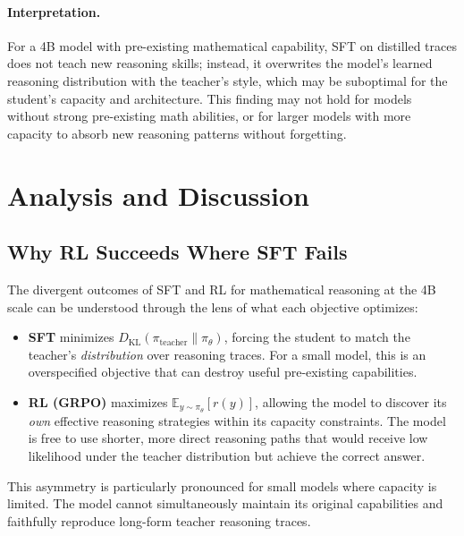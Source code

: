 \documentclass[11pt,a4paper]{article}
\begin{document}
\paragraph{Interpretation.} For a 4B model with pre-existing mathematical capability, SFT on distilled traces does not teach new reasoning skills; instead, it overwrites the model's learned reasoning distribution with the teacher's style, which may be suboptimal for the student's capacity and architecture. This finding may not hold for models without strong pre-existing math abilities, or for larger models with more capacity to absorb new reasoning patterns without forgetting.

\section{Analysis and Discussion}
\label{sec:discussion}

\subsection{Why RL Succeeds Where SFT Fails}

The divergent outcomes of SFT and RL for mathematical reasoning at the 4B scale can be understood through the lens of what each objective optimizes:

\begin{itemize}[leftmargin=*]
    \item \textbf{SFT} minimizes $D_\text{KL}(\pi_{\text{teacher}} \| \pi_\theta)$, forcing the student to match the teacher's \emph{distribution} over reasoning traces. For a small model, this is an overspecified objective that can destroy useful pre-existing capabilities.

    \item \textbf{RL (GRPO)} maximizes $\mathbb{E}_{y \sim \pi_\theta}[r(y)]$, allowing the model to discover its \emph{own} effective reasoning strategies within its capacity constraints. The model is free to use shorter, more direct reasoning paths that would receive low likelihood under the teacher distribution but achieve the correct answer.
\end{itemize}

This asymmetry is particularly pronounced for small models where capacity is limited. The model cannot simultaneously maintain its original capabilities and faithfully reproduce long-form teacher reasoning traces.
\end{document}
